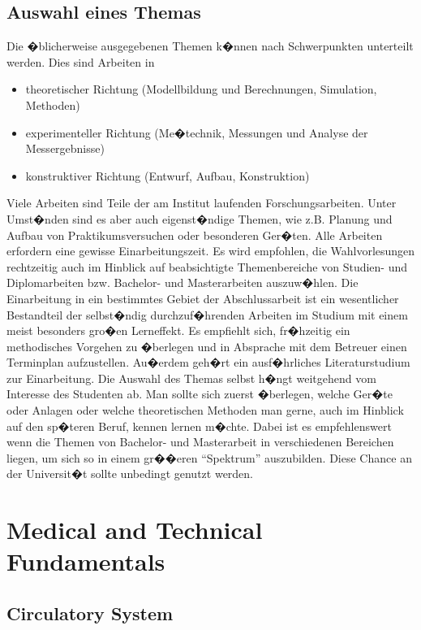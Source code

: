 \section {Auswahl eines Themas}
Die �blicherweise ausgegebenen Themen k�nnen nach Schwerpunkten
unterteilt werden. Dies sind Arbeiten in
\begin{itemize}
 \item theoretischer Richtung (Modellbildung und Berechnungen, Simulation, Methoden)
 \item experimenteller Richtung (Me�technik, Messungen und Analyse der Messergebnisse)
 \item konstruktiver Richtung (Entwurf, Aufbau, Konstruktion)
\end{itemize}


Viele Arbeiten sind Teile der am Institut laufenden Forschungsarbeiten. Unter Umst�nden sind es
aber auch eigenst�ndige Themen, wie z.B. Planung und Aufbau von Praktikumsversuchen oder besonderen
Ger�ten. Alle Arbeiten erfordern eine gewisse Einarbeitungszeit. Es wird empfohlen, die
Wahlvorlesungen rechtzeitig auch im Hinblick auf beabsichtigte Themenbereiche von Studien- und
Diplomarbeiten bzw. Bachelor- und Masterarbeiten auszuw�hlen. Die Einarbeitung in ein bestimmtes
Gebiet der Abschlussarbeit ist ein wesentlicher Bestandteil der selbst�ndig durchzuf�hrenden Arbeiten im Studium mit einem
meist besonders gro�en Lerneffekt. Es empfiehlt sich, fr�hzeitig ein methodisches Vorgehen zu
�berlegen und in Absprache mit dem Betreuer einen Terminplan aufzustellen. Au�erdem geh�rt ein
ausf�hrliches Literaturstudium zur Einarbeitung. Die Auswahl des Themas selbst h�ngt weitgehend vom
Interesse des Studenten ab. Man sollte sich zuerst �berlegen, welche Ger�te oder Anlagen oder
welche theoretischen Methoden man gerne, auch im Hinblick auf den sp�teren Beruf, kennen lernen m�chte. Dabei ist es empfehlenswert wenn die Themen von Bachelor- und Masterarbeit in verschiedenen Bereichen liegen,
um sich so in einem gr��eren "`Spektrum"' auszubilden. Diese Chance an der Universit�t sollte unbedingt genutzt werden.

\chapter{Medical and Technical Fundamentals}

\section{Circulatory System}


